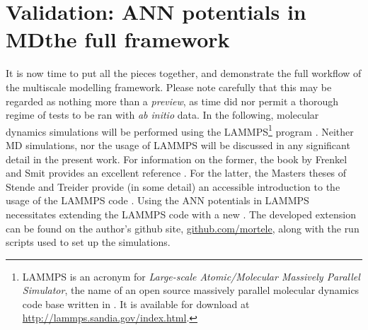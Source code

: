 \documentclass[../../master.tex]{subfiles}
\begin{document}
\chapter{Validation: ANN potentials in MD\textemdash the full framework}
It is now time to put all the pieces together, and demonstrate the full workflow of the multiscale modelling framework. Please note carefully that this may be regarded as nothing more than a \emph{preview}, as time did nor permit a thorough regime of tests to be ran with \emph{ab initio} data.  In the following, molecular dynamics simulations will be performed using the LAMMPS\footnote{LAMMPS is an acronym for \emph{Large-scale Atomic/Molecular Massively Parallel Simulator}, the name of an open source massively parallel molecular dynamics code base written in \CC{}. It is available for download at \url{http://lammps.sandia.gov/index.html}.} program \cite{plimpton1995fast}. Neither MD simulations, nor the usage of LAMMPS will be discussed in any significant detail in the present work. For information on the former, the book by Frenkel and Smit provides an excellent reference \cite{frenkel}. For the latter, the Masters theses of Stende and Treider provide (in some detail) an accessible introduction to the usage of the LAMMPS code \cite{stende,treider}. Using the ANN potentials in LAMMPS necessitates extending the LAMMPS code with a new . The developed extension can be found on the author's github site, \url{github.com/mortele}, along with the run scripts used to set up the simulations.

\phantom{-}
\end{document}
